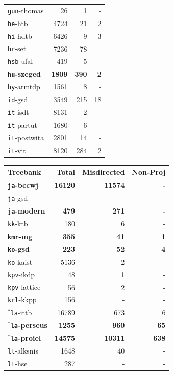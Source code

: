 \begin{table}[H]
{\begin{tabular}{|l|r|r|r|}
\texttt{gun}-thomas & 26 & 1 & -\\
\texttt{he}-htb & 4724 & 21 & 2\\
\texttt{hi}-hdtb & 6426 & 9 & 3\\
\texttt{hr}-set & 7236 & 78 & -\\
\texttt{hsb}-ufal & 419 & 5 & -\\
\textbf{\texttt{hu}-szeged} & \textbf{1809} & \textbf{390} & \textbf{2}\\
\texttt{hy}-armtdp & 1561 & 8 & -\\
\texttt{id}-gsd & 3549 & 215 & 18\\
\texttt{it}-isdt & 8131 & 2 & -\\
\texttt{it}-partut & 1680 & 6 & -\\
\texttt{it}-postwita & 2801 & 14 & -\\
\texttt{it}-vit & 8120 & 284 & 2\\
\hline
\end{tabular}
\hspace{4mm}
\begin{tabular}{|l|r|r|r|}
\hline
\textbf{Treebank} & \textbf{Total} & \textbf{Misdirected} & \textbf{Non-Proj}\\
\hline
\textbf{\texttt{ja}-bccwj} & \textbf{16120} & \textbf{11574} & \textbf{-}\\
\texttt{ja}-gsd & - & - & -\\
\textbf{\texttt{ja}-modern} & \textbf{479} & \textbf{271} & \textbf{-}\\
\texttt{kk}-ktb & 180 & 6 & -\\
\textbf{\texttt{kmr}-mg} & \textbf{355} & \textbf{41} & \textbf{1}\\
\textbf{\texttt{ko}-gsd} & \textbf{223} & \textbf{52} & \textbf{4}\\
\texttt{ko}-kaist & 5136 & 2 & -\\
\texttt{kpv}-ikdp & 48 & 1 & -\\
\texttt{kpv}-lattice & 56 & 2 & -\\
\texttt{krl}-kkpp & 156 & - & -\\
$^{*}$\texttt{la}-ittb & 16789 & 673 & 6\\
$^{*}$\textbf{\texttt{la}-perseus} & \textbf{1255} & \textbf{960} & \textbf{65}\\
$^{*}$\textbf{\texttt{la}-proiel} & \textbf{14575} & \textbf{10311} & \textbf{638}\\
\texttt{lt}-alksnis & 1648 & 40 & -\\
\texttt{lt}-hse & 287 & - & -\\

\end{tabular}}
\end{table}
